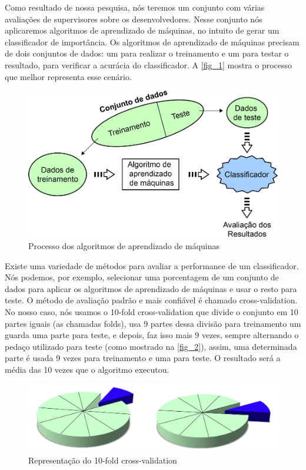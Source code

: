 Como resultado de nossa pesquisa, nós teremos um conjunto com várias avaliações de supervisores sobre os desenvolvedores. Nesse conjunto nós aplicaremos algoritmos de aprendizado de máquinas, no intuito de gerar um classificador de importância. Os algoritmos de aprendizado de máquinas precisam de dois conjuntos de dados: um para realizar o treinamento e um para testar o resultado, para verificar a acurácia do classificador. A \autoref{fig_1} mostra o processo que melhor representa esse cenário.

\begin{figure}[p]
	\centering
	\includegraphics[width=\textwidth]{figs/training-datasets.png}
	\caption{\label{fig_1}Processo dos algoritmos de aprendizado de máquinas}
\end{figure}

Existe uma variedade de métodos para avaliar a performance de um classificador. Nós podemos, por exemplo, selecionar uma porcentagem de um conjunto de dados para aplicar os algoritmos de aprendizado de máquinas e usar o resto para teste. O método de avaliação padrão e mais confiável é chamado cross-validation. No nosso caso, nós usamos o 10-fold cross-validation que divide o conjunto em 10 partes iguais (as chamadas folds), usa 9 partes dessa divisão para treinamento um guarda uma parte para teste, e depois, faz isso mais 9 vezes, sempre alternando o pedaço utilizado para teste (como mostrado na \autoref{fig_2}), assim, uma determinada parte é usada 9 vezes para treinamento e uma para teste. O resultado será a média das 10 vezes que o algoritmo executou.

\begin{figure}[p]
	\centering
	\includegraphics[width=\textwidth]{figs/10-fold-cross-validation.png}
	\caption{\label{fig_2}Representação do 10-fold cross-validation}
\end{figure}

